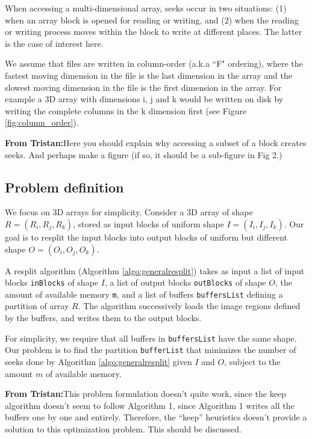 \documentclass[conference]{IEEEtran}
\newcommand{\tristan}[1]{\color{orange}\textbf{From Tristan:}#1\color{black}}
\begin{document}
When accessing a multi-dimensional array, seeks occur in two situations:
(1) when an array block is opened for reading or writing, and (2) when the
reading or writing process moves within the block to write at different
places. The latter is the case of interest here. 

We assume that files are written in column-order (a.k.a ``F" ordering),
where the fastest moving dimension in the file is the last dimension in the
array and the slowest moving dimension in the file is the first dimension
in the array. For example a 3D array with dimensions i, j and k would be
written on disk by writing the complete columns in the k dimension first
(see Figure \ref{fig:column_order}).

\tristan{Here you should explain why accessing a subset of a block creates seeks.
 And perhaps make a figure (if so, it should be a sub-figure in Fig 2.)}

\subsection{Problem definition}

We focus on 3D arrays for simplicity. Consider a 3D array of shape $R =
(R_i, R_j, R_k)$, stored as input blocks of uniform shape $I =
(I_i, I_j, I_k)$. Our goal is to resplit the input blocks into output
blocks of uniform but different shape $O = (O_i, O_j, O_k)$.

A resplit algorithm (Algorithm \ref{algo:generalresplit}) takes as input a
list of input blocks \texttt{inBlocks} of shape $I$, a list of output
blocks \texttt{outBlocks} of shape $O$, the amount of available memory
\texttt{m}, and a list of buffers \texttt{buffersList} defining a partition
of array $R$. The algorithm successively loads the image regions defined by
the buffers, and writes them to the output blocks. 

For simplicity, we require that all buffers in \texttt{buffersList} have
the same shape. Our problem is to find the partition \texttt{bufferList}
that minimizes the number of seeks done by Algorithm
\ref{algo:generalresplit} given $I$ and $O$, subject to the amount $m$
of available memory. 

\tristan{This problem formulation doesn't quite work, since the keep
algorithm doesn't seem to follow Algorithm 1, since Algorithm 1 writes all
the buffers one by one and entirely. Therefore, the ``keep'' heuristics doesn't 
provide a solution to this optimization problem. This should be discussed.}
\end{document}
